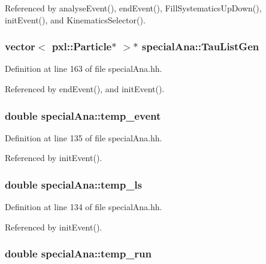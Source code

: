 Referenced by analyse\-Event(), end\-Event(), Fill\-Systematics\-Up\-Down(), init\-Event(), and Kinematics\-Selector().

\subsubsection[{Tau\-List\-Gen}]{\setlength{\rightskip}{0pt plus 5cm}vector$<$ pxl\-::\-Particle$\ast$ $>$$\ast$ special\-Ana\-::\-Tau\-List\-Gen}\label{classspecialAna_a4d474151b634aefba1f87728805d45fe}


Definition at line 163 of file special\-Ana.\-hh.



Referenced by end\-Event(), and init\-Event().

\subsubsection[{temp\-\_\-event}]{\setlength{\rightskip}{0pt plus 5cm}double special\-Ana\-::temp\-\_\-event}\label{classspecialAna_a70360bfdefab8b0cdfd126e40d109c34}


Definition at line 135 of file special\-Ana.\-hh.



Referenced by init\-Event().

\subsubsection[{temp\-\_\-ls}]{\setlength{\rightskip}{0pt plus 5cm}double special\-Ana\-::temp\-\_\-ls}\label{classspecialAna_ad1c4dd4e6eb56e86c4ad24b8f942ebef}


Definition at line 134 of file special\-Ana.\-hh.



Referenced by init\-Event().

\subsubsection[{temp\-\_\-run}]{\setlength{\rightskip}{0pt plus 5cm}double special\-Ana\-::temp\-\_\-run}\label{classspecialAna_a739ec443ba622f962854c133080624db}


